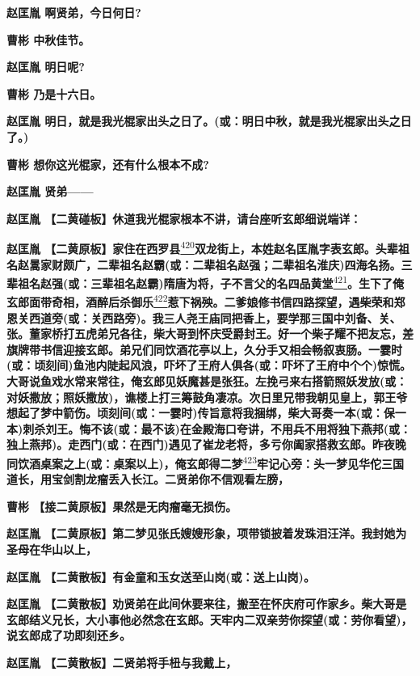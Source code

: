 \textbf{赵匡胤 啊贤弟，今日何日?}

\textbf{曹彬 中秋佳节。}

\textbf{赵匡胤 明日呢?}

\textbf{曹彬 乃是十六日。}

\textbf{赵匡胤
明日，就是我光棍家出头之日了。(或：明日中秋，就是我光棍家出头之日了。)}

\textbf{曹彬 想你这光棍家，还有什么根本不成?}

\textbf{赵匡胤 贤弟------}

\textbf{赵匡胤 【二黄碰板】休道我光棍家根本不讲，请台座听玄郎细说端详：}

\textbf{赵匡胤
【二黄原板】家住在西罗县}\protect\hyperlink{fn420}{\textsuperscript{420}}\textbf{双龙街上，本姓赵名匡胤字表玄郎。头辈祖名赵暠家财颇广，二辈祖名赵霸(或：二辈祖名赵强；二辈祖名淮庆)四海名扬。三辈祖名赵强(或：三辈祖名赵霸)隋唐为将，子不言父的名四品黄堂}\protect\hyperlink{fn421}{\textsuperscript{421}}\textbf{。生下了俺玄郎面带奇相，酒醉后杀御乐}\protect\hyperlink{fn422}{\textsuperscript{422}}\textbf{惹下祸殃。二爹娘修书信四路探望，遇柴荣和郑恩关西道旁(或：关西路旁)。我三人尧王庙同把香上，要学那三国中刘备、关、张。董家桥打五虎弟兄各往，柴大哥到怀庆受爵封王。好一个柴子耀不把友忘，差旗牌带书信迎接玄郎。弟兄们同饮酒花亭以上，久分手又相会畅叙衷肠。一霎时(或：顷刻间)鱼池内陡起风浪，吓坏了王府人俱各(或：吓坏了王府中个个)惊慌。大哥说鱼戏水常来常往，俺玄郎见妖魔甚是张狂。左挽弓来右搭箭照妖发放(或：对妖撒放；照妖撒放)，谯楼上打三筹鼓角凄凉。次日里兄带我朝见皇上，郭王爷想起了梦中箭伤。顷刻间(或：一霎时)传旨意将我捆绑，柴大哥奏一本(或：保一本)刺杀刘王。悔不该(或：最不该)在金殿海口夸讲，不用兵不用将独下燕邦(或：独上燕邦)。走西门(或：在西门)遇见了崔龙老将，多亏你阖家搭救玄郎。昨夜晚同饮酒桌案之上(或：桌案以上)，俺玄郎得二梦}\protect\hyperlink{fn423}{\textsuperscript{423}}\textbf{牢记心旁：头一梦见华佗三国道长，用宝剑割龙瘤丢入长江。二贤弟你不信观看左膀，}

\textbf{曹彬 【接二黄原板】果然是无肉瘤毫无损伤。}

\textbf{赵匡胤
【二黄原板】第二梦见张氏嫂嫂形象，项带锁披着发珠泪汪洋。我封她为圣母在华山以上，}

\textbf{赵匡胤 【二黄散板】有金童和玉女送至山岗(或：送上山岗)。}

\textbf{赵匡胤
【二黄散板】劝贤弟在此间休要来往，搬至在怀庆府可作家乡。柴大哥是玄郎结义兄长，大小事他必然念在玄郎。天牢内二双亲劳你探望(或：劳你看望)，说玄郎成了功即刻还乡。}

\textbf{赵匡胤 【二黄散板】二贤弟将手杻与我戴上，}

